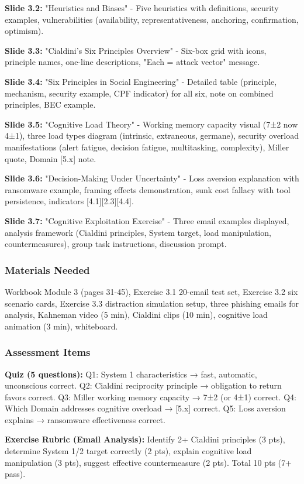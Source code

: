 \documentclass[11pt,a4paper]{article}
\begin{document}
\textbf{Slide 3.2:} "Heuristics and Biases" - Five heuristics with definitions, security examples, vulnerabilities (availability, representativeness, anchoring, confirmation, optimism).

\textbf{Slide 3.3:} "Cialdini's Six Principles Overview" - Six-box grid with icons, principle names, one-line descriptions, "Each = attack vector" message.

\textbf{Slide 3.4:} "Six Principles in Social Engineering" - Detailed table (principle, mechanism, security example, CPF indicator) for all six, note on combined principles, BEC example.

\textbf{Slide 3.5:} "Cognitive Load Theory" - Working memory capacity visual (7±2 now 4±1), three load types diagram (intrinsic, extraneous, germane), security overload manifestations (alert fatigue, decision fatigue, multitasking, complexity), Miller quote, Domain [5.x] note.

\textbf{Slide 3.6:} "Decision-Making Under Uncertainty" - Loss aversion explanation with ransomware example, framing effects demonstration, sunk cost fallacy with tool persistence, indicators [4.1][2.3][4.4].

\textbf{Slide 3.7:} "Cognitive Exploitation Exercise" - Three email examples displayed, analysis framework (Cialdini principles, System target, load manipulation, countermeasures), group task instructions, discussion prompt.

\subsubsection{Materials Needed}
Workbook Module 3 (pages 31-45), Exercise 3.1 20-email test set, Exercise 3.2 six scenario cards, Exercise 3.3 distraction simulation setup, three phishing emails for analysis, Kahneman video (5 min), Cialdini clips (10 min), cognitive load animation (3 min), whiteboard.

\subsubsection{Assessment Items}
\textbf{Quiz (5 questions):} Q1: System 1 characteristics → fast, automatic, unconscious correct. Q2: Cialdini reciprocity principle → obligation to return favors correct. Q3: Miller working memory capacity → 7±2 (or 4±1) correct. Q4: Which Domain addresses cognitive overload → [5.x] correct. Q5: Loss aversion explains → ransomware effectiveness correct.

\textbf{Exercise Rubric (Email Analysis):} Identify 2+ Cialdini principles (3 pts), determine System 1/2 target correctly (2 pts), explain cognitive load manipulation (3 pts), suggest effective countermeasure (2 pts). Total 10 pts (7+ pass).
\end{document}
